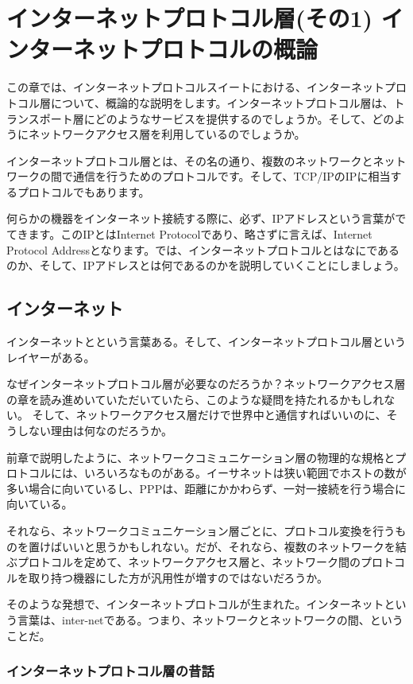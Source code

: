\chapter{インターネットプロトコル層(その1) インターネットプロトコルの概論}

この章では、インターネットプロトコルスイートにおける、インターネットプロトコル層について、概論的な説明をします。インターネットプロトコル層は、トランスポート層にどのようなサービスを提供するのでしょうか。そして、どのようにネットワークアクセス層を利用しているのでしょうか。

インターネットプロトコル層とは、その名の通り、複数のネットワークとネットワークの間で通信を行うためのプロトコルです。そして、TCP/IPのIPに相当するプロトコルでもあります。

何らかの機器をインターネット接続する際に、必ず、IPアドレスという言葉がでてきます。このIPとはInternet Protocolであり、略さずに言えば、Internet Protocol Addressとなります。では、インターネットプロトコルとはなにであるのか、そして、IPアドレスとは何であるのかを説明していくことにしましょう。

\section{インターネット}

インターネットとという言葉ある。そして、インターネットプロトコル層というレイヤーがある。

なぜインターネットプロトコル層が必要なのだろうか？ネットワークアクセス層の章を読み進めいていただいていたら、このような疑問を持たれるかもしれない。
そして、ネットワークアクセス層だけで世界中と通信すればいいのに、そうしない理由は何なのだろうか。

前章で説明したように、ネットワークコミュニケーション層の物理的な規格とプロトコルには、いろいろなものがある。イーサネットは狭い範囲でホストの数が多い場合に向いているし、PPPは、距離にかかわらず、一対一接続を行う場合に向いている。

それなら、ネットワークコミュニケーション層ごとに、プロトコル変換を行うものを置けばいいと思うかもしれない。だが、それなら、複数のネットワークを結ぶプロトコルを定めて、ネットワークアクセス層と、ネットワーク間のプロトコルを取り持つ機器にした方が汎用性が増すのではないだろうか。

そのような発想で、インターネットプロトコルが生まれた。インターネットという言葉は、inter-netである。つまり、ネットワークとネットワークの間、ということだ。

\subsection{インターネットプロトコル層の昔話}

